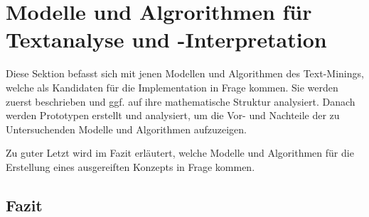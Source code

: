 \section{Modelle und Algrorithmen für Textanalyse und -Interpretation}

Diese Sektion befasst sich mit jenen Modellen und Algorithmen des Text-Minings, welche als Kandidaten für die Implementation in Frage kommen. Sie werden zuerst beschrieben und ggf. auf ihre mathematische Struktur analysiert. Danach werden Prototypen erstellt und analysiert, um die Vor- und Nachteile der zu Untersuchenden Modelle und Algorithmen aufzuzeigen.

Zu guter Letzt wird im Fazit erläutert, welche Modelle und Algorithmen für die Erstellung eines ausgereiften Konzepts in Frage kommen.



\newpage



\newpage



\subsection{Fazit}